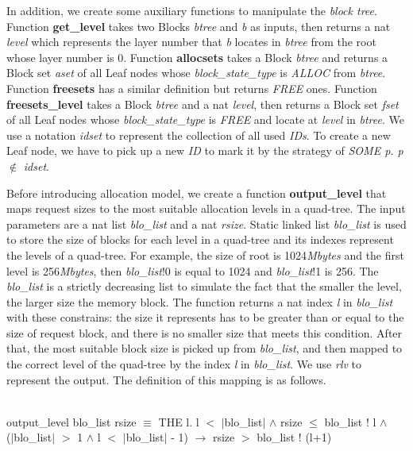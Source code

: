 In addition, we create some auxiliary functions to manipulate the \textsl{block tree}. Function \textbf{get\_level} takes two Blocks \emph{btree} and \emph{b} as inputs, then returns a nat \emph{level} which represents the layer number that \emph{b} locates in \emph{btree} from the root whose layer number is 0. Function \textbf{allocsets} takes a Block \emph{btree} and returns a Block set \emph{aset} of all Leaf nodes whose \emph{block\_state\_type} is \emph{ALLOC} from \emph{btree}. Function \textbf{freesets} has a similar definition but returns \emph{FREE} ones. Function \textbf{freesets\_level} takes a Block \emph{btree} and a nat \emph{level}, then returns a Block set \emph{fset} of all Leaf nodes whose \emph{block\_state\_type} is \emph{FREE} and locate at \emph{level} in \emph{btree}. We use a notation \emph{idset} to represent the collection of all used \emph{IDs}. To create a new Leaf node, we have to pick up a new \emph{ID} to mark it by the strategy of \emph{SOME p. p} $\notin$ \emph{idset}.

Before introducing allocation model, we create a function \textbf{output\_level} that maps request sizes to the most suitable allocation levels in a quad-tree. The input parameters are a nat list \emph{blo\_list} and a nat \emph{rsize}. Static linked list \emph{blo\_list} is used to store the size of blocks for each level in a quad-tree and its indexes represent the levels of a quad-tree. For example, the size of root is 1024\emph{Mbytes} and the first level is 256\emph{Mbytes}, then \emph{blo\_list}!0 is equal to 1024 and \emph{blo\_list}!1 is 256. The \emph{blo\_list} is a strictly decreasing list to simulate the fact that the smaller the level, the larger size the memory block. The function returns a nat index \emph{l} in \emph{blo\_list} with these constrains: the size it represents has to be greater than or equal to the size of request block, and there is no smaller size that meets this condition. After that, the most suitable block size is picked up from \emph{blo\_list}, and then mapped to the correct level of the quad-tree by the index \emph{l} in \emph{blo\_list}. We use \emph{rlv} to represent the output. The definition of this mapping is as follows.

\begin{definition}  \\
	output\_level blo\_list rsize $\equiv$ THE l. l $<$ $\vert$blo\_list$\vert$ $\wedge$ rsize $\le$ blo\_list ! l $\wedge$ \\
	\phantom{x} \hspace{10pt} ($\vert$blo\_list$\vert$ $>$ 1 $\wedge$ l $<$ $\vert$blo\_list$\vert$ - 1) $\longrightarrow$ rsize $>$ blo\_list ! (l+1)
\end{definition}

